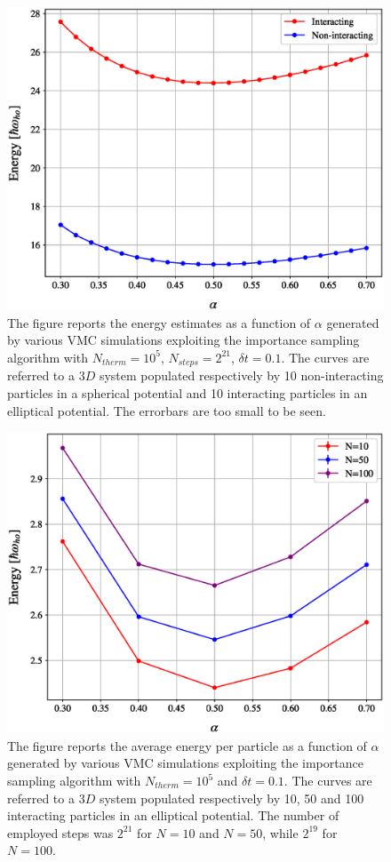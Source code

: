 \begin{figure}[H]
    \includegraphics[scale=0.37]{images/varying_alpha_comparison_interacting_and_not.eps}
    \caption{The figure reports the energy estimates as a function of $\alpha$ generated by various VMC simulations exploiting the importance sampling algorithm with $N_{therm}=10^5$, $N_{steps}=2^{21}$, $\delta t = 0.1$. The curves are referred to a $3D$ system populated respectively by 10 non-interacting particles in a spherical potential and 10 interacting particles in an elliptical potential. The errorbars are too small to be seen. }
    \label{fig:asymm_symm_comparison}
\end{figure}


\begin{figure}[H]
    \includegraphics[scale=0.37]{images/energy_over_N.eps}
    \caption{The figure reports the average energy per particle as a function of $\alpha$ generated by various VMC simulations exploiting the importance sampling algorithm with $N_{therm}=10^5$ and $\delta t = 0.1$. The curves are referred to a $3D$ system populated respectively by 10, 50 and 100 interacting particles in an elliptical potential. The number of employed steps was $2^{21}$ for $N=10$ and $N=50$, while $2^{19}$ for $N=100$. }
    \label{fig:E_over_N}
\end{figure}


